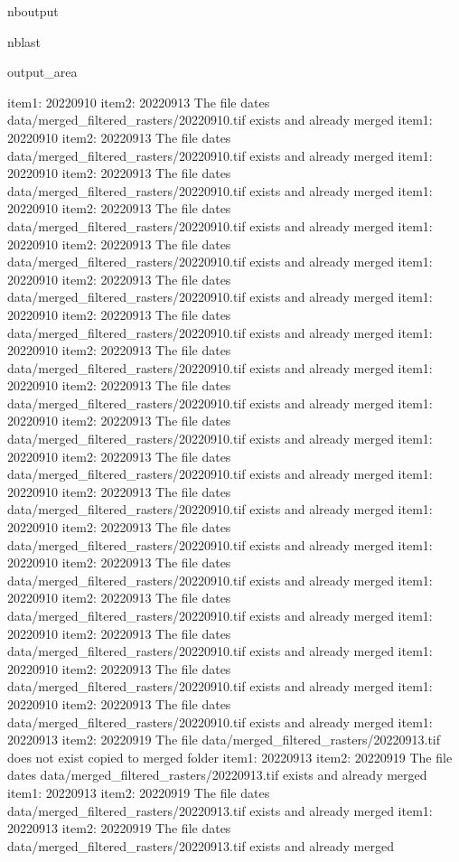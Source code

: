 \documentclass[letterpaper,10pt]{sphinxmanual}
\begin{document}
\begin{sphinxuseclass}{nboutput}
\begin{sphinxuseclass}{nblast}
{\begin{sphinxuseclass}{output_area}
\begin{sphinxuseclass}{}
\begin{sphinxVerbatim}[commandchars=\\\{\}]
item1:  20220910
item2:  20220913
The file dates data/merged\_filtered\_rasters/20220910.tif exists and already merged
item1:  20220910
item2:  20220913
The file dates data/merged\_filtered\_rasters/20220910.tif exists and already merged
item1:  20220910
item2:  20220913
The file dates data/merged\_filtered\_rasters/20220910.tif exists and already merged
item1:  20220910
item2:  20220913
The file dates data/merged\_filtered\_rasters/20220910.tif exists and already merged
item1:  20220910
item2:  20220913
The file dates data/merged\_filtered\_rasters/20220910.tif exists and already merged
item1:  20220910
item2:  20220913
The file dates data/merged\_filtered\_rasters/20220910.tif exists and already merged
item1:  20220910
item2:  20220913
The file dates data/merged\_filtered\_rasters/20220910.tif exists and already merged
item1:  20220910
item2:  20220913
The file dates data/merged\_filtered\_rasters/20220910.tif exists and already merged
item1:  20220910
item2:  20220913
The file dates data/merged\_filtered\_rasters/20220910.tif exists and already merged
item1:  20220910
item2:  20220913
The file dates data/merged\_filtered\_rasters/20220910.tif exists and already merged
item1:  20220910
item2:  20220913
The file dates data/merged\_filtered\_rasters/20220910.tif exists and already merged
item1:  20220910
item2:  20220913
The file dates data/merged\_filtered\_rasters/20220910.tif exists and already merged
item1:  20220910
item2:  20220913
The file dates data/merged\_filtered\_rasters/20220910.tif exists and already merged
item1:  20220910
item2:  20220913
The file dates data/merged\_filtered\_rasters/20220910.tif exists and already merged
item1:  20220910
item2:  20220913
The file dates data/merged\_filtered\_rasters/20220910.tif exists and already merged
item1:  20220910
item2:  20220913
The file dates data/merged\_filtered\_rasters/20220910.tif exists and already merged
item1:  20220910
item2:  20220913
The file dates data/merged\_filtered\_rasters/20220910.tif exists and already merged
item1:  20220910
item2:  20220913
The file dates data/merged\_filtered\_rasters/20220910.tif exists and already merged
item1:  20220913
item2:  20220919
The file data/merged\_filtered\_rasters/20220913.tif does not exist copied to merged folder
item1:  20220913
item2:  20220919
The file dates data/merged\_filtered\_rasters/20220913.tif exists and already merged
item1:  20220913
item2:  20220919
The file dates data/merged\_filtered\_rasters/20220913.tif exists and already merged
item1:  20220913
item2:  20220919
The file dates data/merged\_filtered\_rasters/20220913.tif exists and already merged

\end{sphinxVerbatim}
\end{sphinxuseclass}
\end{sphinxuseclass}}
\end{sphinxuseclass}
\end{sphinxuseclass}
\end{document}
